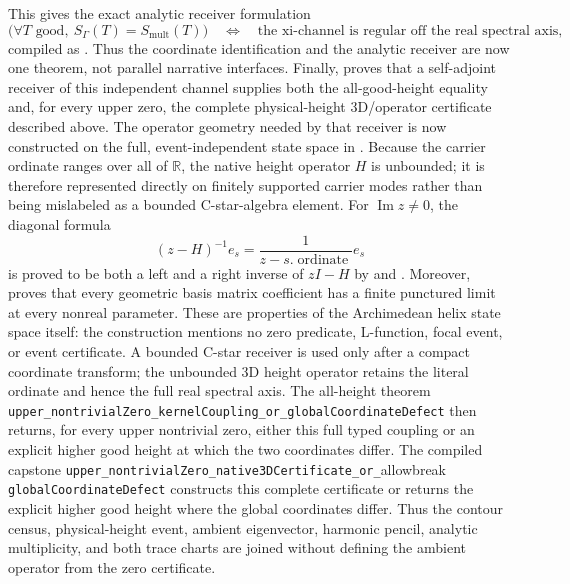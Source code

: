 \documentclass[11pt]{article}
\theoremstyle{definition}
\begin{document}
This gives the exact analytic receiver formulation
\[
 \bigl(\forall T\text{ good},\ S_\Gamma(T)=S_{\mathrm{mult}}(T)\bigr)
 \quad\Longleftrightarrow\quad
 \text{the xi-channel is regular off the real spectral axis},
\]
compiled as
.
Thus the coordinate identification and the analytic receiver are now one theorem,
not parallel narrative interfaces.  Finally,
proves that a self-adjoint receiver of this independent channel supplies both the
all-good-height equality and, for every upper zero, the complete physical-height
3D/operator certificate described above.
The operator geometry needed by that receiver is now constructed on the full,
event-independent state space in
.  Because the carrier
ordinate ranges over all of \(\mathbb R\), the native height operator \(H\) is
unbounded; it is therefore represented directly on finitely supported carrier
modes rather than being mislabeled as a bounded C-star-algebra element.  For
\(\operatorname{Im}z\ne0\), the diagonal formula
\[
  (z-H)^{-1}e_s=\frac{1}{z-s.\operatorname{ordinate}}e_s
\]
is proved to be both a left and a right inverse of \(zI-H\) by
 and
.  Moreover,
 proves that every
geometric basis matrix coefficient has a finite punctured limit at every
nonreal parameter.  These are properties of the Archimedean helix state space
itself: the construction mentions no zero predicate, L-function, focal event,
or event certificate.  A bounded C-star receiver is used only after a compact
coordinate transform; the unbounded 3D height operator retains the literal
ordinate and hence the full real spectral axis.
The all-height theorem
\texttt{upper\_nontrivialZero\_kernelCoupling\_or\_globalCoordinateDefect}
then returns, for every upper nontrivial zero, either this full typed coupling
or an explicit higher good height at which the two coordinates differ.
The
compiled capstone
\texttt{upper\_nontrivialZero\_native3DCertificate\_or\_}allowbreak
\texttt{globalCoordinateDefect} constructs this complete certificate or
returns the explicit higher good height where the global coordinates differ.
Thus the contour census, physical-height event, ambient eigenvector, harmonic
pencil, analytic multiplicity, and both trace charts are joined without
defining the ambient operator from the zero certificate.
\end{document}
